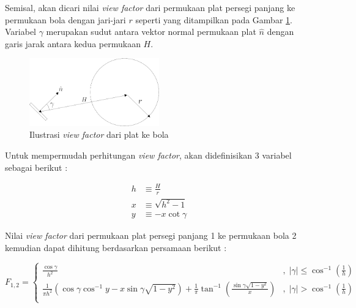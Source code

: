 Semisal, akan dicari nilai \textit{view factor} dari permukaan plat persegi
panjang ke permukaan bola dengan jari-jari $r$ seperti yang ditampilkan pada
Gambar \ref{fig:platball}. Variabel $\gamma$ merupakan sudut antara vektor
normal permukaan plat $\hat{n}$ dengan garis jarak antara kedua permukaan $H$.

\begin{figure}[!ht]
\setlength{}
\begin{center}
\includegraphics[width=0.5\textwidth]{fig/platball.png}
	\caption{Ilustrasi \textit{view factor} dari plat ke bola}
\label{fig:platball}
\end{center}
\end{figure}

Untuk mempermudah perhitungan \textit{view factor}, akan didefinisikan 3 variabel sebagai berikut :

\begin{equation}
\begin{split}
\label{eq:hxy}
	h &\equiv \frac{H}{r} \\
	x &\equiv \sqrt{h^2 - 1} \\
	y &\equiv -x \cot{\gamma}
\end{split}
\end{equation}

Nilai \textit{view factor} dari permukaan plat persegi panjang 1 ke permukaan
bola 2 kemudian dapat dihitung berdasarkan persamaan berikut \cite{martinez2022a}:

\begin{equation}
	F_{1,2} = 
\begin{cases} 
	\frac{\cos{\gamma}}{h^2} & ,\;|\gamma| \leq \cos^{-1}\left(\frac{1}{h}\right) \\
	\frac{1}{\pi h^2} \left( \cos{\gamma}\cos^{-1}y - x\sin{\gamma}\sqrt{1-y^2} \right) + \frac{1}{\pi}\tan^{-1}\left( \frac{\sin{\gamma}\sqrt{1-y^2}}{x} \right) & ,\;|\gamma| > \cos^{-1}\left(\frac{1}{h}\right) \\
\end{cases}
\label{eq:vf}
\end{equation}

